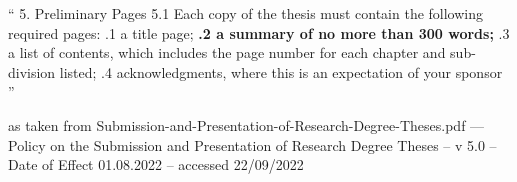 
`` 5. Preliminary Pages
5.1 Each copy of the thesis must contain the following required pages:
.1 a title page;
\textbf{.2 a summary of no more than 300 words;}
.3 a list of contents, which includes the page number for each chapter and sub-division listed;
.4 acknowledgments, where this is an expectation of your sponsor ''

as taken from Submission-and-Presentation-of-Research-Degree-Theses.pdf --- Policy on the Submission and Presentation of Research Degree Theses -- v 5.0 -- Date of Effect
01.08.2022 -- accessed 22/09/2022